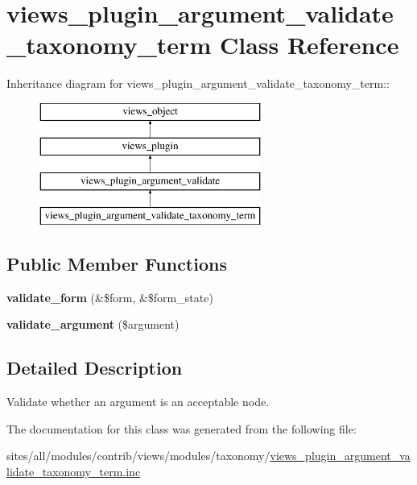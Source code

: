 \hypertarget{classviews__plugin__argument__validate__taxonomy__term}{
\section{views\_\-plugin\_\-argument\_\-validate\_\-taxonomy\_\-term Class Reference}
\label{classviews__plugin__argument__validate__taxonomy__term}
}
Inheritance diagram for views\_\-plugin\_\-argument\_\-validate\_\-taxonomy\_\-term::\begin{figure}[H]
\begin{center}
\leavevmode
\includegraphics[height=4cm]{classviews__plugin__argument__validate__taxonomy__term}
\end{center}
\end{figure}
\subsection*{Public Member Functions}
\begin{CompactItemize}
\item 
\hypertarget{classviews__plugin__argument__validate__taxonomy__term_6f1cfcb0ca7229a9b4cef0f5e9d66514}{
\textbf{validate\_\-form} (\&\$form, \&\$form\_\-state)}
\label{classviews__plugin__argument__validate__taxonomy__term_6f1cfcb0ca7229a9b4cef0f5e9d66514}

\item 
\hypertarget{classviews__plugin__argument__validate__taxonomy__term_0f9fe327e689aa9a2323bab307161073}{
\textbf{validate\_\-argument} (\$argument)}
\label{classviews__plugin__argument__validate__taxonomy__term_0f9fe327e689aa9a2323bab307161073}

\end{CompactItemize}


\subsection{Detailed Description}
Validate whether an argument is an acceptable node. 

The documentation for this class was generated from the following file:\begin{CompactItemize}
\item 
sites/all/modules/contrib/views/modules/taxonomy/\hyperlink{views__plugin__argument__validate__taxonomy__term_8inc}{views\_\-plugin\_\-argument\_\-validate\_\-taxonomy\_\-term.inc}\end{CompactItemize}
